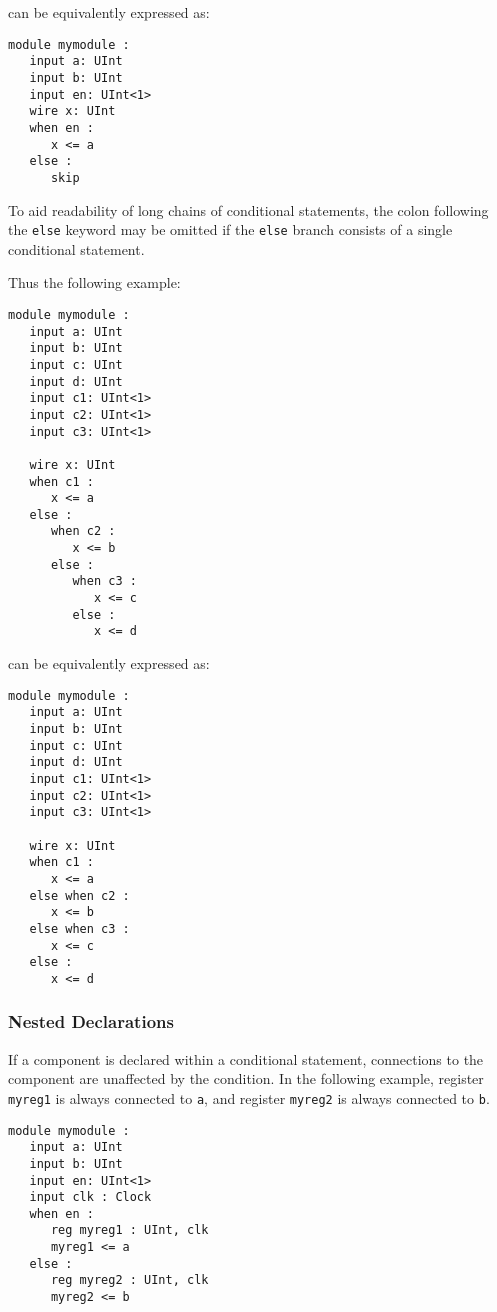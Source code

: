 \documentclass[12pt]{article}
\begin{document}
can be equivalently expressed as:

\begin{verbatim}
module mymodule :
   input a: UInt
   input b: UInt
   input en: UInt<1>
   wire x: UInt
   when en :
      x <= a
   else : 
      skip   
\end{verbatim}

To aid readability of long chains of conditional statements, the colon following the \verb|else| keyword may be omitted if the \verb|else| branch consists of a single conditional statement.

Thus the following example:

\begin{verbatim}
module mymodule :
   input a: UInt
   input b: UInt
   input c: UInt
   input d: UInt
   input c1: UInt<1>
   input c2: UInt<1>
   input c3: UInt<1>

   wire x: UInt
   when c1 :
      x <= a
   else :
      when c2 :
         x <= b
      else :
         when c3 :
            x <= c  
         else :
            x <= d       
\end{verbatim}

can be equivalently expressed as:

\begin{verbatim}
module mymodule :
   input a: UInt
   input b: UInt
   input c: UInt
   input d: UInt
   input c1: UInt<1>
   input c2: UInt<1>
   input c3: UInt<1>

   wire x: UInt
   when c1 :
      x <= a
   else when c2 :
      x <= b
   else when c3 :
      x <= c  
   else :
      x <= d       
\end{verbatim}

\subsubsection{Nested Declarations}
If a component is declared within a conditional statement, connections to the component are unaffected by the condition. In the following example, register \verb|myreg1| is always connected to \verb|a|, and register \verb|myreg2| is always connected to \verb|b|.

\begin{verbatim}
module mymodule :
   input a: UInt
   input b: UInt
   input en: UInt<1>
   input clk : Clock
   when en :
      reg myreg1 : UInt, clk
      myreg1 <= a
   else :
      reg myreg2 : UInt, clk
      myreg2 <= b
\end{verbatim}
\end{document}
